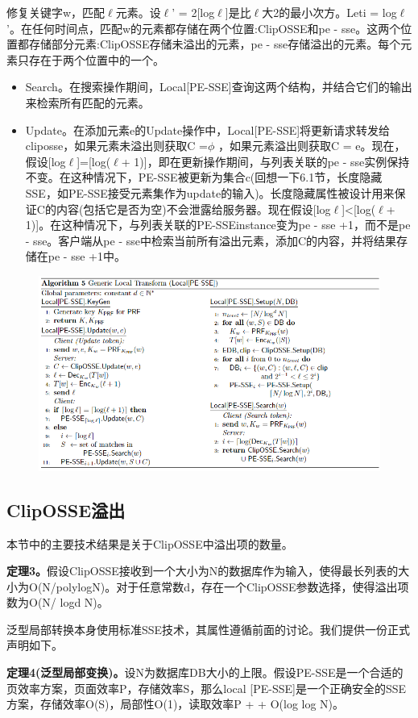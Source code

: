 \documentclass[UTF8]{article}
\begin{document}
修复关键字w，匹配$\ell$元素。设$\ell$' = 2[log$\ell$]是比$\ell$大2的最小次方。Leti = log$\ell$'。在任何时间点，匹配w的元素都存储在两个位置:ClipOSSE和pe - sse。这两个位置都存储部分元素:ClipOSSE存储未溢出的元素，pe - sse存储溢出的元素。每个元素只存在于两个位置中的一个。

\begin{itemize}
  \item Search。在搜索操作期间，Local[PE-SSE]查询这两个结构，并结合它们的输出来检索所有匹配的元素。
  \item Update。在添加元素e的Update操作中，Local[PE-SSE]将更新请求转发给cliposse，如果元素未溢出则获取C =$\phi$ ，如果元素溢出则获取C = {e}。现在，假设[log$\ell$]=[log($\ell$+ 1)]，即在更新操作期间，与列表关联的pe - sse实例保持不变。在这种情况下，PE-SSE被更新为集合c(回想一下6.1节，长度隐藏SSE，如PE-SSE接受元素集作为update的输入)。长度隐藏属性被设计用来保证C的内容(包括它是否为空)不会泄露给服务器。现在假设[log$\ell$]<[log($\ell$+ 1)]。在这种情况下，与列表关联的PE-SSEinstance变为pe - sse +1，而不是pe - sse。客户端从pe - sse中检索当前所有溢出元素，添加C的内容，并将结果存储在pe - sse +1中。
\end{itemize}
\begin{figure}[ht]
  \centering
  \includegraphics[scale=0.5]{table7.png}
  \label{table7}
\end{figure}
\subsection{ClipOSSE溢出}
本节中的主要技术结果是关于ClipOSSE中溢出项的数量。

\textbf{定理3。}假设ClipOSSE接收到一个大小为N的数据库作为输入，使得最长列表的大小为O(N/polylogN)。对于任意常数d，存在一个ClipOSSE参数选择，使得溢出项数为O(N/ logd N)。

泛型局部转换本身使用标准SSE技术，其属性遵循前面的讨论。我们提供一份正式声明如下。

\textbf{定理4(泛型局部变换)。}设N为数据库DB大小的上限。假设PE-SSE是一个合适的页效率方案，页面效率P，存储效率S，那么local [PE-SSE]是一个正确安全的SSE方案，存储效率O(S)，局部性O(1)，读取效率P + + O(log log N)。


\end{document}
